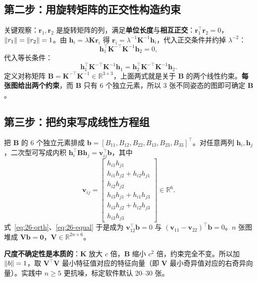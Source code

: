 \subsection{第二步：用旋转矩阵的正交性构造约束}

关键观察：$\bm{r}_1,\bm{r}_2$ 是旋转矩阵的列，满足\textbf{单位长度}与\textbf{相互正交}：$\bm{r}_1^{\top}\bm{r}_2=0$，$\left\lVert r_1 \right\rVert=\left\lVert r_2 \right\rVert=1$。由 $\bm{h}_i=\lambda\bm{K}\bm{r}_i$ 得 $\bm{r}_i=\lambda^{-1}\bm{K}^{-1}\bm{h}_i$，代入正交条件并约掉 $\lambda^{-2}$：
\begin{equation}
\bm{h}_1^{\top}\bm{K}^{-\top}\bm{K}^{-1}\bm{h}_2=0,
\label{eq:26-orth}
\end{equation}
代入等长条件：
\begin{equation}
\bm{h}_1^{\top}\bm{K}^{-\top}\bm{K}^{-1}\bm{h}_1=\bm{h}_2^{\top}\bm{K}^{-\top}\bm{K}^{-1}\bm{h}_2.
\label{eq:26-equal}
\end{equation}
定义对称矩阵 $\bm{B}=\bm{K}^{-\top}\bm{K}^{-1}\in\mathbb{R}^{3\times3}$，上面两式就是关于 $\bm{B}$ 的两个线性约束。\textbf{每张图给出两个约束}，而 $\bm{B}$ 只有 6 个独立元素，所以 3 张不同姿态的图即可确定 $\bm{B}$。

\subsection{第三步：把约束写成线性方程组}

把 $\bm{B}$ 的 6 个独立元素排成 $\bm{b}=[B_{11},B_{12},B_{22},B_{13},B_{23},B_{33}]^{\top}$。对任意两列 $\bm{h}_i,\bm{h}_j$，二次型可写成内积 $\bm{h}_i^{\top}\bm{B}\bm{h}_j=\bm{v}_{ij}^{\top}\bm{b}$，其中
\begin{equation}
\bm{v}_{ij}=\begin{bmatrix}
h_{i1}h_{j1}\\
h_{i1}h_{j2}+h_{i2}h_{j1}\\
h_{i2}h_{j2}\\
h_{i3}h_{j1}+h_{i1}h_{j3}\\
h_{i3}h_{j2}+h_{i2}h_{j3}\\
h_{i3}h_{j3}
\end{bmatrix}\in\mathbb{R}^{6}.
\label{eq:26-vij}
\end{equation}
式~\eqref{eq:26-orth}、\eqref{eq:26-equal} 于是成为 $\bm{v}_{12}^{\top}\bm{b}=0$ 与 $(\bm{v}_{11}-\bm{v}_{22})^{\top}\bm{b}=0$。$n$ 张图堆成 $\bm{V}\bm{b}=\bm{0}$，$\bm{V}\in\mathbb{R}^{2n\times6}$。

\textbf{尺度不确定性是本质的}：$\bm{K}$ 放大 $c$ 倍，$\bm{B}$ 缩小 $c^2$ 倍，约束完全不变。所以加 $\left\lVert b \right\rVert=1$，取 $\bm{V}^{\top}\bm{V}$ 最小特征值对应的特征向量（即 $\bm{V}$ 最小奇异值对应的右奇异向量）。实践中 $n\ge5$ 更抗噪，标定软件默认 20--30 张。

